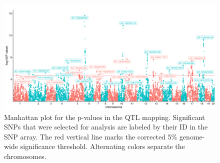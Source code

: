 \begin{refsection}
\begin{figure}
    \centering
    \includegraphics[width=\linewidth]{chapter_atchley/media/selected_snps.png}
    \caption[Manhattan plot multivariate growth]{Manhattan plot for the p-values in the QTL mapping. Significant SNPs that were selected for analysis are labeled by their ID in the SNP array. The red vertical line marks the corrected 5\% genome-wide significance threshold. Alternating colors separate the chromosomes.}
    \label{manhattan}
\end{figure}


\end{refsection}
